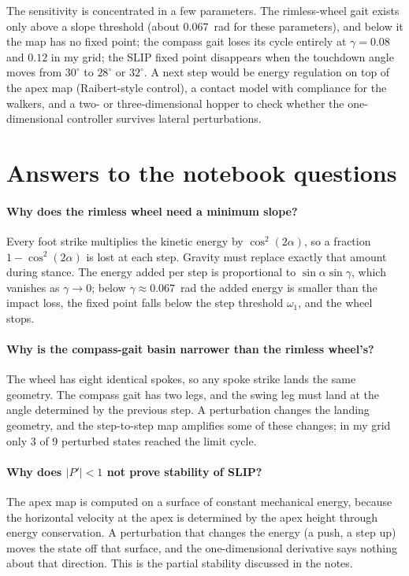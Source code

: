 \documentclass[11pt]{report}
\begin{document}
The sensitivity is concentrated in a few parameters.  The rimless-wheel gait
exists only above a slope threshold (about 0.067~rad for these parameters), and
below it the map has no fixed point; the compass gait loses its cycle entirely
at $\gamma=0.08$ and $0.12$ in my grid; the SLIP fixed point disappears when
the touchdown angle moves from $30^\circ$ to $28^\circ$ or $32^\circ$.  A next
step would be energy regulation on top of the apex map (Raibert-style control),
a contact model with compliance for the walkers, and a two- or
three-dimensional hopper to check whether the one-dimensional controller
survives lateral perturbations.

\section{Answers to the notebook questions}

\paragraph{Why does the rimless wheel need a minimum slope?}  Every foot strike
multiplies the kinetic energy by $\cos^2(2\alpha)$, so a fraction
$1-\cos^2(2\alpha)$ is lost at each step.  Gravity must replace exactly that
amount during stance.  The energy added per step is proportional to
$\sin\alpha\sin\gamma$, which vanishes as $\gamma\to0$; below
$\gamma\approx0.067$~rad the added energy is smaller than the impact loss, the
fixed point falls below the step threshold $\omega_1$, and the wheel stops.

\paragraph{Why is the compass-gait basin narrower than the rimless wheel's?}
The wheel has eight identical spokes, so any spoke strike lands the same
geometry.  The compass gait has two legs, and the swing leg must land at the
angle determined by the previous step.  A perturbation changes the landing
geometry, and the step-to-step map amplifies some of these changes; in my grid
only 3 of 9 perturbed states reached the limit cycle.

\paragraph{Why does $|P'|<1$ not prove stability of SLIP?}  The apex map is
computed on a surface of constant mechanical energy, because the horizontal
velocity at the apex is determined by the apex height through energy
conservation.  A perturbation that changes the energy (a push, a step up) moves
the state off that surface, and the one-dimensional derivative says nothing
about that direction.  This is the partial stability discussed in the notes.
\end{document}
